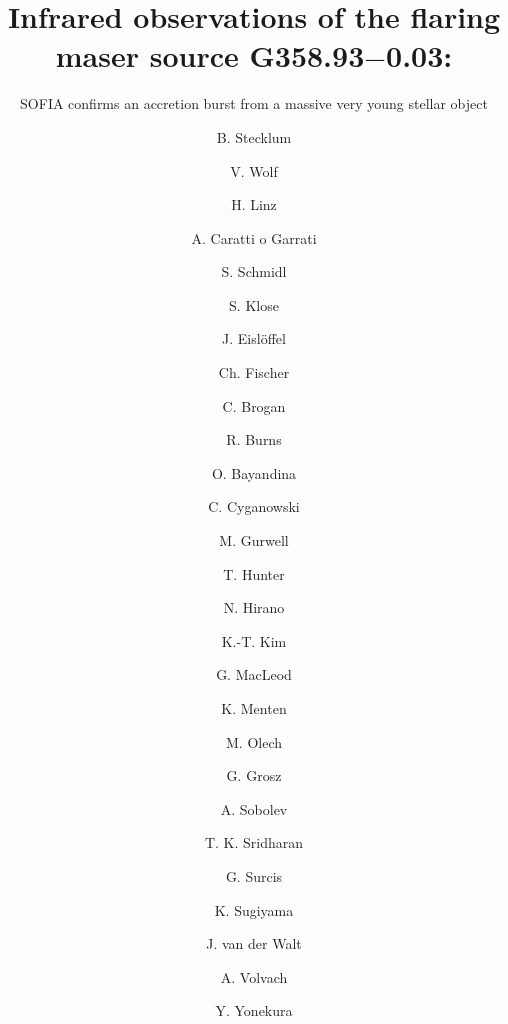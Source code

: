 \documentclass[longauth,usenatbib]{aa}
\begin{document}
 


   \title{Infrared observations of the flaring maser source G358.93$-$0.03:}
   \subtitle{SOFIA confirms an accretion burst from a massive very young stellar object}

   \author{B. Stecklum
          \and
          V. Wolf
          \and
          H. Linz
          \and
          A. Caratti o Garrati
          \and
          S. Schmidl
          \and
          S. Klose
          \and
          J. Eislöffel
          \and 
          Ch. Fischer
          \and
          C. Brogan
          \and
          R. Burns
          \and
          O. Bayandina
          \and
          C. Cyganowski
          \and
          M. Gurwell
          \and
          T. Hunter
          \and
          N. Hirano
          \and
          K.-T. Kim
          \and
          G. MacLeod
          \and
          K. Menten
          \and
          M. Olech
          \and
          G. Grosz
          \and
          A. Sobolev
          \and
          T. K. Sridharan
          \and
          G. Surcis
          \and
          K. Sugiyama
          \and
          J. van der Walt
          \and
          A. Volvach
          \and
          Y. Yonekura
          }
\end{document}
